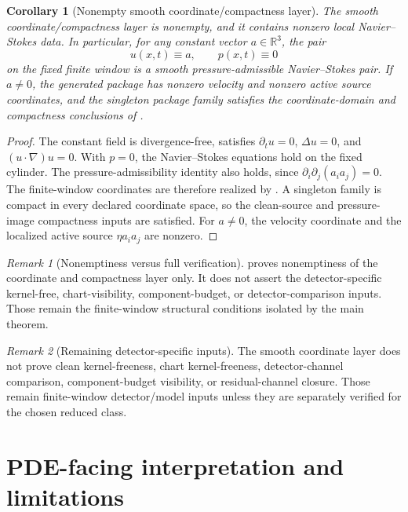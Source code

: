 \documentclass[11pt]{article}
\numberwithin{equation}{section}
\newtheorem{corollary}[corollary]{Corollary}
\theoremstyle{definition}
\theoremstyle{remark}
\newtheorem{remark}[remark]{Remark}
\begin{document}
\begin{corollary}[Nonempty smooth coordinate/compactness layer]\label{cor:nonempty-smooth-coordinate-class}
The smooth coordinate/compactness layer is nonempty, and it contains nonzero local Navier--Stokes data.  In particular, for any constant vector \(a\in\mathbb R^3\), the pair
\[
        u(x,t)\equiv a,
        \qquad
        p(x,t)\equiv 0
\]
on the fixed finite window is a smooth pressure-admissible Navier--Stokes pair.  If \(a\ne0\), the generated package has nonzero velocity and nonzero active source coordinates, and the singleton package family satisfies the coordinate-domain and compactness conclusions of .
\end{corollary}

\begin{proof}
The constant field is divergence-free, satisfies \(\partial_t u=0\), \(\Delta u=0\), and \((u\cdot\nabla)u=0\).  With \(p=0\), the Navier--Stokes equations hold on the fixed cylinder.  The pressure-admissibility identity also holds, since \(\partial_i\partial_j(a_i a_j)=0\).  The finite-window coordinates are therefore realized by .  A singleton family is compact in every declared coordinate space, so the clean-source and pressure-image compactness inputs are satisfied.  For \(a\ne0\), the velocity coordinate and the localized active source \(\eta a_i a_j\) are nonzero.
\end{proof}

\begin{remark}[Nonemptiness versus full verification]
\label{rem:nonempty-not-full-verification}
 proves nonemptiness of the coordinate and compactness layer only.  It does not assert the detector-specific kernel-free, chart-visibility, component-budget, or detector-comparison inputs.  Those remain the finite-window structural conditions isolated by the main theorem.
\end{remark}

\begin{remark}[Remaining detector-specific inputs]
The smooth coordinate layer does not prove clean kernel-freeness, chart kernel-freeness, detector-channel comparison, component-budget visibility, or residual-channel closure.  Those remain finite-window detector/model inputs unless they are separately verified for the chosen reduced class.
\end{remark}

\section{PDE-facing interpretation and limitations}\label{sec:pde-status-main}
\end{document}
